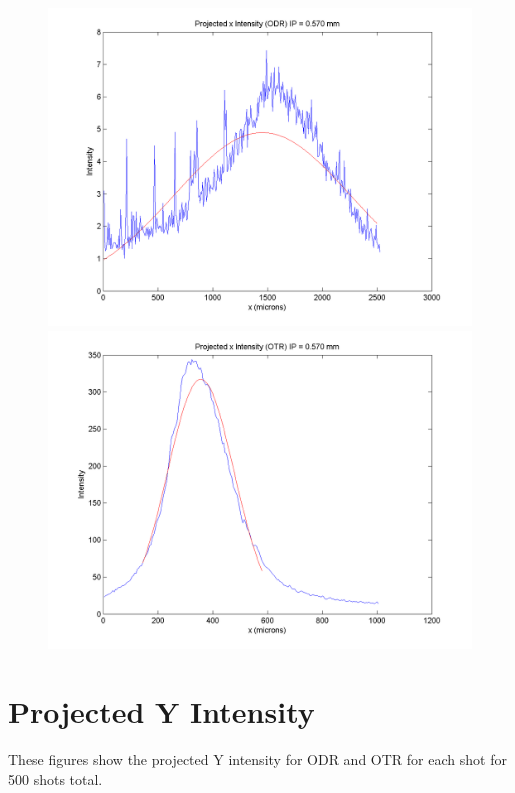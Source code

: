 \documentclass[12pt]{article}
\begin{document}
\begin{figure}
\begin{center}
\includegraphics[scale=0.5]{Figures/ProjX_ODR_570.PNG}
\includegraphics[scale=0.5]{Figures/ProjX_OTR_570.PNG}
\caption{}
\end{center}
\end{figure}



\newpage

\section{Projected Y Intensity}

These figures show the projected Y intensity for ODR and OTR for each shot for 500 shots total.
\end{document}

